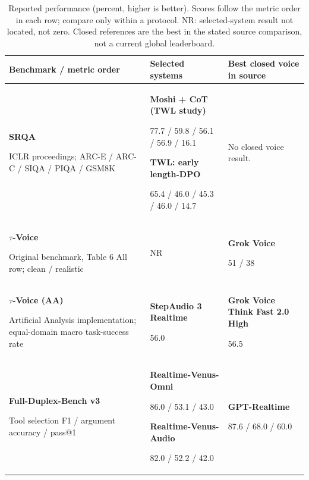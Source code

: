 \begin{table}[H]
\centering\small
\setlength{\tabcolsep}{4pt}
\setlength{\tablewidth}{\dimexpr\linewidth-4\tabcolsep\relax}
\renewcommand{\arraystretch}{1.06}
\caption{Reported performance (percent, higher is better). Scores follow the metric order in each row; compare only within a protocol. NR: selected-system result not located, not zero. Closed references are the best in the stated source comparison, not a current global leaderboard.}
\label{tab:performance}
\begin{tabular}{@{}>{\raggedright\arraybackslash}p{0.28\tablewidth}>{\raggedright\arraybackslash}p{0.44\tablewidth}>{\raggedright\arraybackslash}p{0.28\tablewidth}@{}}
\toprule
\textbf{Benchmark / metric order} & \textbf{Selected systems} & \textbf{Best closed voice in source} \\
\midrule
\textbf{SRQA}\par ICLR proceedings; ARC-E / ARC-C / SIQA / PIQA / GSM8K\par\citep{thinklisten} & \textbf{Moshi + CoT (TWL study)}\par 77.7 / 59.8 / 56.1 / 56.9 / 16.1\par\smallskip \textbf{TWL: early length-DPO}\par 65.4 / 46.0 / 45.3 / 46.0 / 14.7 & No closed voice result. \\
\addlinespace[2pt]
\textbf{$\tau$-Voice}\par Original benchmark, Table 6 All row; clean / realistic\par\citep{tauvoice} & NR & \textbf{Grok Voice}\par 51 / 38 \\
\addlinespace[2pt]
\textbf{$\tau$-Voice (AA)}\par Artificial Analysis implementation; equal-domain macro task-success rate\par\citep{step3} & \textbf{StepAudio 3 Realtime}\par 56.0 & \textbf{Grok Voice Think Fast 2.0 High}\par 56.5 \\
\addlinespace[2pt]
\textbf{Full-Duplex-Bench v3}\par Tool selection F1 / argument accuracy / pass@1\par\citep{fdb3,venus} & \textbf{Realtime-Venus-Omni}\par 86.0 / 53.1 / 43.0\par\smallskip \textbf{Realtime-Venus-Audio}\par 82.0 / 52.2 / 42.0 & \textbf{GPT-Realtime}\par 87.6 / 68.0 / 60.0 \\

\end{tabular}
\end{table}

